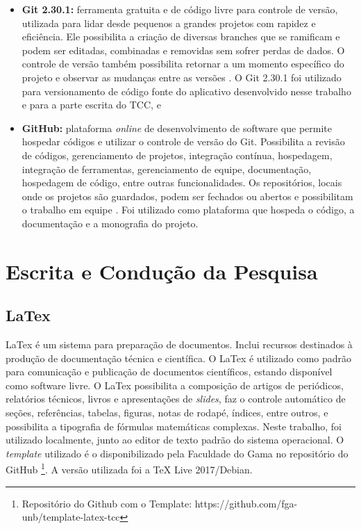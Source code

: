 \begin{itemize}

    \item \textbf{Git 2.30.1: }ferramenta gratuita e de código livre para controle 
	de versão, utilizada para lidar desde pequenos a grandes projetos com rapidez e 
	eficiência. Ele possibilita a criação de diversas branches que se ramificam e 
	podem ser editadas, combinadas e removidas sem sofrer perdas de dados. O controle de 
	versão também possibilita retornar a um momento específico do projeto e observar as 
	mudanças entre as versões \cite{git2020}. O Git 2.30.1 foi utilizado para versionamento de código fonte 
	do aplicativo desenvolvido nesse trabalho 
	e para a parte escrita do TCC, e
	\item \textbf{GitHub: }plataforma \emph{online} de desenvolvimento de 
	software que permite hospedar códigos e utilizar o controle de versão do Git. 
	Possibilita a revisão de códigos, gerenciamento de projetos, integração contínua, 
	hospedagem, integração de ferramentas, gerenciamento de equipe, documentação, 
	hospedagem de código, entre outras funcionalidades. Os repositórios, locais 
	onde os projetos são guardados, podem ser fechados ou abertos e possibilitam o 
	trabalho em equipe \cite{github2020}. Foi utilizado como plataforma que hospeda o código, 
	a documentação e a monografia do projeto.
    
\end{itemize}

\section{Escrita e Condução da Pesquisa}

\subsection{LaTex}

LaTex \cite{latex2020} é um sistema para preparação de documentos. Inclui 
recursos destinados à produção de documentação técnica e científica. O LaTex é 
utilizado como padrão para comunicação e publicação de documentos científicos, estando 
disponível como software livre. O LaTex possibilita a composição de artigos de 
periódicos, relatórios técnicos, livros e apresentações de \emph{slides}, faz 
o controle automático de seções, referências, tabelas, figuras, notas de rodapé, 
índices, entre outros, e possibilita a tipografia de fórmulas matemáticas 
complexas. Neste trabalho, foi utilizado localmente, junto ao editor de texto 
padrão do sistema operacional. O \emph{template} utilizado é o disponibilizado pela 
Faculdade do Gama no repositório do GitHub \footnote{Repositório do Github com o Template: https://github.com/fga-unb/template-latex-tcc}.
A versão utilizada foi a TeX Live 2017/Debian.


